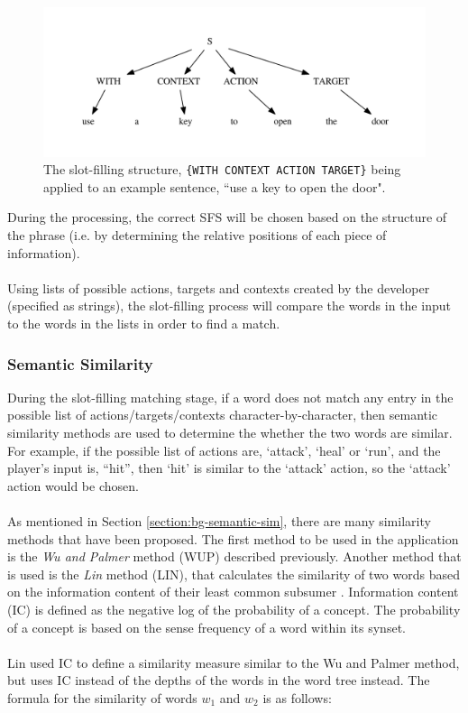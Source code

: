 \documentclass[11pt]{article}
\begin{document}
\begin{center}
\begin{figure}[H]
\begin{center}
  \includegraphics[width=\linewidth]{sfs-2.pdf}
  \caption{The slot-filling structure, \texttt{\{WITH CONTEXT ACTION TARGET\}} being applied to an example sentence, ``use a key to open the door".}
  \label{fig:sfs-2}
  \end{center}
\end{figure}
\end{center}

During the processing, the correct SFS will be chosen based on the structure of the phrase (i.e. by determining the relative positions of each piece of information).
\\
\\
Using lists of possible actions, targets and contexts created by the developer (specified as strings), the slot-filling process will compare the words in the input to the words in the lists in order to find a match.

\subsubsection{Semantic Similarity}
\label{semantic-sim-design}

During the slot-filling matching stage, if a word does not match any entry in the possible list of actions/targets/contexts character-by-character, then semantic similarity methods are used to determine the whether the two words are similar. For example, if the possible list of actions are, `attack', `heal' or `run', and the player's input is, ``hit'', then `hit' is similar to the `attack' action, so the `attack' action would be chosen.
\\
\\
As mentioned in Section \ref{section:bg-semantic-sim}, there are many similarity methods that have been proposed. The first method to be used in the application is the \textit{Wu and Palmer} method (WUP) described previously. Another method that is used is the \textit{Lin} method (LIN), that calculates the similarity of two words based on the information content of their least common subsumer \cite{RefWorks:46}. Information content (IC) is defined as the negative log of the probability of a concept. The probability of a concept is based on the sense frequency of a word within its synset.
\\
\\
Lin used IC to define a similarity measure similar to the Wu and Palmer method, but uses IC instead of the depths of the words in the word tree instead. The formula for the similarity of words $w_1$ and $w_2$ is as follows:
\end{document}
